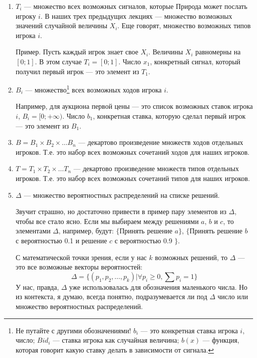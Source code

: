 \begin{enumerate}
\item $ T_{i} $ --- множество всех возможных сигналов, которые Природа может послать игроку $ i $. В наших трех предыдущих лекциях --- множество возможных значений случайной величины $ X_{i} $. Еще говорят, множество возможных типов игрока $ i $.

Пример. Пусть каждый игрок знает свое $ X_{i} $. Величины $ X_{i}  $ равномерны на $ [0;1] $. В этом случае $ T_{i}=[0;1] $. Число $ x_{1} $, конкретный сигнал, который получил первый игрок --- это элемент из $ T_{1} $. 
\item $ B_{i} $ --- множество\footnote{Не путайте с другими обозначениями! $ b_{i} $ --- это конкретная ставка игрока $ i $, число; $ Bid_{i} $ --- ставка игрока как случайная величина; $ b(x) $ --- функция, которая говорит какую ставку делать в зависимости от сигнала.}  всех возможных ходов игрока $ i $. 

Например, для аукциона первой цены --- это список возможных ставок игрока $ i $, $ B_{i}=[0;+\infty) $. Число $ b_{1} $, конкретная ставка, которую сделал первый игрок --- это элемент из $ B_{1} $.

\item $ B=B_{1}\times B_{2}\times \ldots B_{n} $ --- декартово произведение множеств ходов отдельных игроков. Т.е. это набор всех возможных сочетаний ходов для наших игроков.

\item $ T=T_{1}\times T_{2}\times \ldots T_{n} $ --- декартово произведение множеств типов отдельных игроков. Т.е. это набор всех возможных сочетаний типов для наших игроков.
 
\item $ \Delta $ --- множество вероятностных распределений на списке решений. 

Звучит страшно, но достаточно привести в пример пару элементов из $ \Delta $, чтобы все стало ясно. Если мы выбираем между решениями $ a $, $ b $ и $ c $, то элементами $ \Delta $, например, будут: $ \{ $Принять решение $ a\} $, $ \{ $Принять решение $ b $ с вероятностью 0.1 и решение $c$ с вероятностью 0.9 $ \}$. 

С математической точки зрения, если у нас $ k $ возможных решений, то $ \Delta $ --- это все возможные векторы вероятностей:
\begin{equation}
\Delta=\{(p_{1},p_{2},\ldots,p_{k})|\forall p_{i}\geq 0, \sum p_{i}=1 \}
\end{equation}
У нас, правда, $ \Delta $ уже использовалась для обозначения маленького числа. Но из контекста, я думаю, всегда понятно, подразумевается ли под $ \Delta $ число или множество вероятностных распределений.

\end{enumerate}

